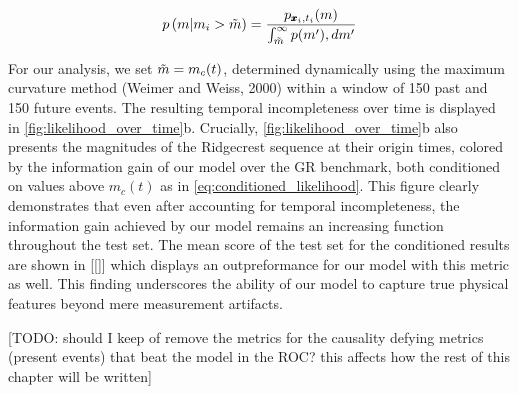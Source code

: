 \documentclass[pdflatex]{sn-jnl}
\begin{document}
\begin{equation}
    p \left( m \vert m_i > \Tilde{m} \right) = \frac{p_{\pmb{x}_i, t_i}(m)} {\int_{\Tilde{m}}^{\infty} p(m') ,dm'}
    \label{eq:conditioned_likelihood}
\end{equation}

For our analysis, we set $\Tilde{m} = m_c(t)$, determined dynamically using the maximum curvature method (Weimer and Weiss, 2000) within a window of 150 past and 150 future events. The resulting temporal incompleteness over time is displayed in \ref{fig:likelihood_over_time}b.
Crucially, \ref{fig:likelihood_over_time}b also presents the magnitudes of the Ridgecrest sequence at their origin times, colored by the information gain of our model over the GR benchmark, both conditioned on values above $m_c(t)$ as in \ref{eq:conditioned_likelihood}. This figure clearly demonstrates that even after accounting for temporal incompleteness, the information gain achieved by our model remains an increasing function throughout the test set. The mean score of the test set for the conditioned results are shown in [[]] which displays an outpreformance for our model with this metric as well. This finding underscores the ability of our model to capture true physical features beyond mere measurement artifacts.


[TODO: should I keep of remove the metrics for the causality defying metrics (present events) that beat the model in the ROC? this affects how the rest of this chapter will be written]















\let\oldbibliography\thebibliography
\renewcommand{\thebibliography}[1]{%
  \oldbibliography{#1}%
  \setlength{\itemsep}{10pt}%
}
% 
% 
\newpage

\end{document}
